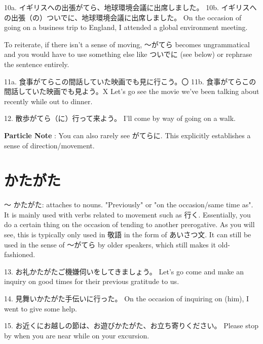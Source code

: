 \par{10a. イギリスへの出張がてら、地球環境会議に出席しました。 \hfill\break
10b. イギリスへの出張（の）ついでに、地球環境会議に出席しました。 \hfill\break
On the occasion of going on a business trip to England, I attended a global environment meeting. }

\par{ To reiterate, if there isn't a sense of moving, ～がてら becomes ungrammatical and you would have to use something else like ついでに (see below) or rephrase the sentence entirely. }

\par{11a. 食事がてらこの間話していた映画でも見に行こう。〇 \hfill\break
11b. 食事がてらこの間話していた映画でも見よう。X \hfill\break
Let's go see the movie we've been talking about recently while out to dinner. }

\par{12. 散歩がてら（に）行って来よう。 \hfill\break
I'll come by way of going on a walk. }

\par{\textbf{Particle Note }: You can also rarely see がてらに. This explicitly establishes a sense of direction\slash movement. }
      
\section{かたがた}
 
\par{ ～ かたがた: attaches to nouns. "Previously" or "on the occasion\slash same time as". It is mainly used with verbs related to movement such as 行く. Essentially, you do a certain thing on the occasion of tending to another prerogative. As you will see, this is typically only used in 敬語 in the form of あいさつ文. It can still be used in the sense of ～がてら by older speakers, which still makes it old-fashioned. }

\par{13. お礼かたがたご機嫌伺いをしてきましょう。 \hfill\break
Let's go come and make an inquiry on good times for their previous gratitude to us. }

\par{14. 見舞いかたがた手伝いに行った。 \hfill\break
On the occasion of inquiring on (him), I went to give some help. }

\par{15. お近くにお越しの節は、お遊びかたがた、お立ち寄りください。 \hfill\break
Please stop by when you are near while on your excursion.  }

